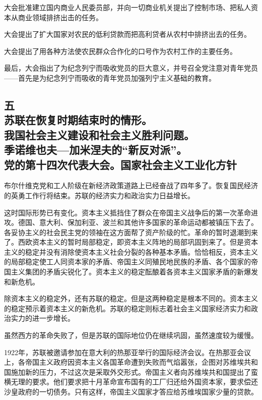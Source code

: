 大会批准建立国内商业人民委员部，并向一切商业机关提出了控制市场、把私人资本从商业领域排挤出击的任务。

大会提出了扩大国家对农民的低利贷款而把高利贷者从农村中排挤出去的任务。

大会提出了用各种方法使农民群众合作化的口号作为农村工作的主要任务。

最后，大会指出了为纪念列宁而吸收党员的巨大意义，并号召全党注意对青年党员——首先是为纪念列宁而吸收的青年党员加强列宁主义基础的教育。


\subsection[五\q 苏联在恢复时期结束时的情形。我国社会主义建设和社会主义胜利问题。季诺维也夫—加米涅夫的“新反对派”。党的第十四次代表大会。国家社会主义工业化方针]{五\\苏联在恢复时期结束时的情形。\\我国社会主义建设和社会主义胜利问题。\\季诺维也夫—加米涅夫的“新反对派”。\\党的第十四次代表大会。国家社会主义工业化方针}

布尔什维克党和工人阶级在新经济政策道路上已经奋战了四年多了。恢复国民经济的英勇工作行将结束。苏联的经济实力和政治实力日益增长。

这时国际形势已有变化。资本主义抵挡住了群众在帝国主义战争后的第一次革命进攻。德国、意大利、保加利亚、波兰和其他许多国家的革命运动都被镇压下去了。各妥协主义的社会民主党的领袖在这方面帮了资产阶级的忙。革命的暂时退潮到来了。西欧资本主义的暂时局部稳定，即资本主义阵地的局部巩固到来了。但是资本主义的稳定并没有消除使资本主义社会分裂的各种基本矛盾。恰恰相反，资本主义的局部稳定使工人同资本家的矛盾、帝国主义同殖民地民族的矛盾、各个国家的帝国主义集团的矛盾尖锐化了。资本主义的稳定酝酿着各资本主义国家矛盾的新爆发和新危机。

除资本主义的稳定外，还有苏联的稳定。但是这两种稳定是根本不同的。资本主义的稳定预示着资本主义的新危机。苏联的稳定则标志着社会主义国家经济实力和政治实力的进一步增长。

虽然西方的革命失败了，但是苏联的国际地位仍在继续巩固，虽然速度较为缓慢。

1922年，苏联被邀请参加在意大利的热那亚举行的国际经济会议。在热那亚会议上，各帝国主义政府因资本主义各国革命遭到失败而气焰嚣张，企图对苏维埃共和国施加新的压力，不过这次是采取外交形式。帝国主义者向苏维埃共和国提出了蛮横无理的要求。他们要求把十月革命宣布国有的工厂归还给外国资本家，要求偿还沙皇政府的一切债务。只有这样，帝国主义国家才答应给苏维埃国家少量的贷款。

